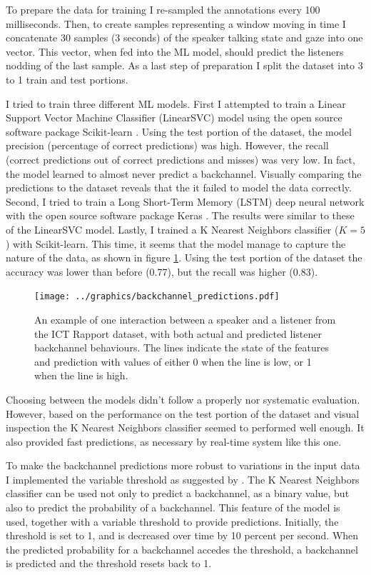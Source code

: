 \documentclass[]{simple-thesis}
\begin{document}
To prepare the data for training I re-sampled the annotations every 100 milliseconds.
Then, to create samples representing a window moving in time I concatenate 30 samples (3 seconds) of the speaker talking state and gaze into one vector.
This vector, when fed into the ML model, should predict the listeners nodding of the last sample.
As a last step of preparation I split the dataset into 3 to 1 train and test portions.

I tried to train three different ML models.
First I attempted to train a Linear Support Vector Machine Classifier (LinearSVC) model using the open source software package Scikit-learn \citep{Pedregosa2011}.
Using the test portion of the dataset, the model precision (percentage of correct predictions) was high.
However, the recall (correct predictions out of correct predictions and misses) was very low.
In fact, the model learned to almost never predict a backchannel.
Visually comparing the predictions to the dataset reveals that the it failed to model the data correctly.
Second, I tried to train a Long Short-Term Memory (LSTM) deep neural network with the open source software package Keras \citep{Chollet2015}.
The results were similar to these of the LinearSVC model.
Lastly, I trained a K Nearest Neighbors classifier ($K = 5$) with Scikit-learn.
This time, it seems that the model manage to capture the nature of the data, as shown in figure \ref{fig:system:backchannel_predictions}.
Using the test portion of the dataset the accuracy was lower than before (0.77), but the recall was higher (0.83).

\begin{figure}
  \texttt{[image: ../graphics/backchannel\_predictions.pdf]}
  \caption{An example of one interaction between a speaker and a listener from the ICT Rapport dataset, with both actual and predicted listener backchannel behaviours. The lines indicate the state of the features and prediction with values of either 0 when the line is low, or 1 when the line is high.}
  \label{fig:system:backchannel_predictions}
\end{figure}

Choosing between the models didn't follow a properly nor systematic evaluation.
However, based on the performance on the test portion of the dataset and visual inspection the K Nearest Neighbors classifier seemed to performed well enough.
It also provided fast predictions, as necessary by real-time system like this one.

To make the backchannel predictions more robust to variations in the input data I implemented the variable threshold as suggested by \cite{Kok2012}.
The K Nearest Neighbors classifier can be used not only to predict a backchannel, as a binary value, but also to predict the probability of a backchannel.
This feature of the model is used, together with a variable threshold to provide predictions.
Initially, the threshold is set to 1, and is decreased over time by 10 percent per second.
When the predicted probability for a backchannel accedes the threshold, a backchannel is predicted and the threshold resets back to 1.
\end{document}
